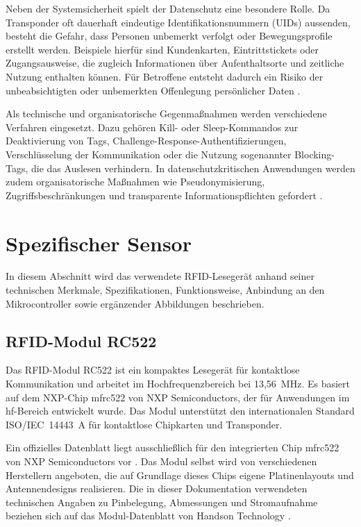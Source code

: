 Neben der Systemsicherheit spielt der Datenschutz eine besondere Rolle. 
Da Transponder oft dauerhaft eindeutige Identifikationsnummern (UIDs) aussenden, besteht die Gefahr, dass Personen unbemerkt verfolgt oder Bewegungsprofile erstellt werden. 
Beispiele hierfür sind Kundenkarten, Eintrittstickets oder Zugangsausweise, die zugleich Informationen über Aufenthaltsorte und zeitliche Nutzung enthalten können. 
Für Betroffene entsteht dadurch ein Risiko der unbeabsichtigten oder unbemerkten Offenlegung persönlicher Daten \cite{finkenzeller:2019}.

Als technische und organisatorische Gegenmaßnahmen werden verschiedene Verfahren eingesetzt. 
Dazu gehören Kill- oder Sleep-Kommandos zur Deaktivierung von Tags, Challenge-Response-Authentifizierungen, Verschlüsselung der Kommunikation oder die Nutzung sogenannter Blocking-Tags, die das Auslesen verhindern. 
In datenschutzkritischen Anwendungen werden zudem organisatorische Maßnahmen wie Pseudonymisierung, Zugriffsbeschränkungen und transparente Informationspflichten gefordert \cite{Mitrokotsa:2010,Aragones:2007,finkenzeller:2019}.
















\section{Spezifischer Sensor}


In diesem Abschnitt wird das verwendete RFID-Lesegerät anhand seiner technischen Merkmale, Spezifikationen, Funktionsweise, 
Anbindung an den Mikrocontroller sowie ergänzender Abbildungen beschrieben.

\subsection{RFID-Modul RC522}

Das RFID-Modul RC522 ist ein kompaktes Lesegerät für kontaktlose Kommunikation und arbeitet im Hochfrequenzbereich bei 13{,}56~MHz. 
Es basiert auf dem NXP-Chip \ac{mfrc522} von NXP Semiconductors, der für Anwendungen im \ac{hf}-Bereich entwickelt wurde.
Das Modul unterstützt den internationalen Standard ISO/IEC~14443~A für kontaktlose Chipkarten und Transponder.

Ein offizielles Datenblatt liegt ausschließlich für den integrierten Chip \ac{mfrc522} von NXP Semiconductors vor \cite{NXP:2016}. 
Das Modul selbst wird von verschiedenen Herstellern angeboten, die auf Grundlage dieses Chips eigene Platinenlayouts und Antennendesigns realisieren. 
Die in dieser Dokumentation verwendeten technischen Angaben zu Pinbelegung, Abmessungen und Stromaufnahme beziehen sich auf das Modul-Datenblatt von Handson Technology \cite{Handsontec:2023}.

